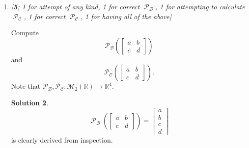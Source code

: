 \documentclass{amsart}
\theoremstyle{definition}
\theoremstyle{definition}
\newtheorem*{solution}{Solution}
\DeclareMathOperator{\R}{\mathbb{R}}
\DeclareMathOperator{\1}{\mathbbm{1}}
\DeclareMathOperator{\powerset}{\mathcal{P}}
\DeclareMathOperator{\B}{\mathcal{B}}
\DeclareMathOperator{\CC}{\mathcal{C}}
\begin{document}
\begin{enumerate}[itemsep = 2mm]
\begin{enumerate}[label=\arabic*.]
			
			\begin{solution}
				In the order listed above, let $\B = \set{b_1,b_2,b_3,b_4}$ and $\CC = \set{c_1,c_2,c_3,c_4}$. Let $\set{a_i}_{i=1}^{4}$ be a set of scalars (in $\R$). Note that the matrix equation
				\begin{align*}
				\sum_{i=1}^{4} a_i b_i = \begin{bmatrix}
				0 & 0 \\ 0 & 0
				\end{bmatrix}
				\end{align*}
				admits only $a_1=a_2=a_3=a_4 = 0$. So $\B$ is a set of linearly independent matrices. Also, note that any $W = \begin{bmatrix}
				w & x \\ y & z 
				\end{bmatrix}$ can be written as $W = w b_1 + x b_2 + y b_3 + z b_4$, hence the set of matrices is spanning.
				
				A very similar argument can be used to argue $\CC$ defines a basis as well.
			\end{solution}
		
		
			\item \textit{[\textbf{5}; 1 for attempt of any kind, 1 for correct $\powerset_{\B}$, 1 for attempting to calculate $\powerset_{\CC}$, 1 for correct $\powerset_{\CC}$, 1 for having all of the above]}
			
			Compute 
			\begin{equation*}
			\mathcal{P}_{\mathcal{B}}\left(
			\begin{bmatrix}
			a&b\\
			c&d
			\end{bmatrix}\right)
			\end{equation*}
			and 
			\begin{equation*}
			\mathcal{P}_{\mathcal{C}}\left(
			\begin{bmatrix}
			a&b\\
			c&d
			\end{bmatrix}\right). 
			\end{equation*}
			Note that $\mathcal{P}_{\mathcal{B}},\mathcal{P}_{\mathcal{C}}:\mathcal{M}_2(\mathbb{R})\to \mathbb{R}^4$. 
			
			
			\begin{solution}
				\begin{equation}
				\label{eqcoordinatisationB}
				\powerset_{\B} \left(
				\begin{bmatrix}
				a&b\\
				c&d
				\end{bmatrix}\right) = \begin{bmatrix}
				a \\ b \\ c \\ d
				\end{bmatrix}
				\end{equation}
				is clearly derived from inspection.
				

\end{solution}
\end{enumerate}
\end{enumerate}
\end{document}
